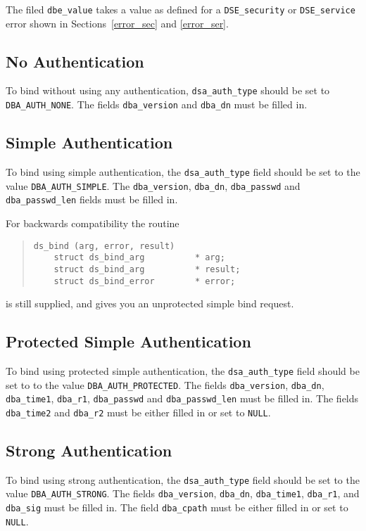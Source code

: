 The filed \verb"dbe_value" takes a value as defined for a \verb"DSE_security"
or \verb"DSE_service" error shown in Sections~\ref{error_sec} and
\ref{error_ser}.

\subsection{No Authentication}

To bind without using any authentication, 
\verb+dsa_auth_type+ should be set to 
\verb+DBA_AUTH_NONE+.
The fields \verb+dba_version+ and \verb+dba_dn+ must be filled in.

\subsection{Simple Authentication}

To bind using simple authentication, 
the \verb+dsa_auth_type+ field should be set to the value
\verb+DBA_AUTH_SIMPLE+.
The \verb+dba_version+, \verb+dba_dn+,
\verb+dba_passwd+ and 
\verb+dba_passwd_len+ fields must be filled in.

For backwards compatibility the routine
\begin{quote}\small\begin{verbatim}
ds_bind (arg, error, result)
    struct ds_bind_arg          * arg;
    struct ds_bind_arg          * result;
    struct ds_bind_error        * error;
\end{verbatim}\end{quote}
is still supplied, and gives you an unprotected simple bind request.


\subsection{Protected Simple Authentication}

To bind using protected simple authentication, 
the \verb+dsa_auth_type+ field should be set to to the value
\verb+DBA_AUTH_PROTECTED+.
The fields \verb+dba_version+, \verb+dba_dn+, \verb+dba_time1+, \verb+dba_r1+,
\verb+dba_passwd+ and \verb+dba_passwd_len+ must be filled in. The fields
\verb+dba_time2+ and \verb+dba_r2+ must be either filled in or set to 
\verb+NULL+.

\subsection{Strong Authentication}

To bind using strong authentication, 
the \verb+dsa_auth_type+ field should be set to the value
\verb+DBA_AUTH_STRONG+.
The fields \verb+dba_version+, \verb+dba_dn+, \verb+dba_time1+, \verb+dba_r1+,
and \verb+dba_sig+ must be filled in. The field
\verb+dba_cpath+ must be either filled in or set to \verb+NULL+.

